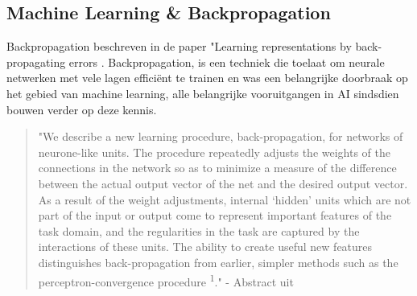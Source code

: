\subsection{Machine Learning \& Backpropagation}
\label{ssec:machinelearaningandbackpropagation}
Backpropagation beschreven in de paper "Learning representations by back-propagating errors \autocite{Rumelhart1986}.
Backpropagation, is een techniek die toelaat om neurale netwerken met vele lagen efficiënt te trainen en was een belangrijke doorbraak op het gebied van machine learning, alle belangrijke vooruitgangen in AI sindsdien bouwen verder op deze kennis.

\begin{quote}
    "We describe a new learning procedure, back-propagation, for networks of neurone-like units. The procedure repeatedly adjusts the weights of the connections in the network so as to minimize a measure of the difference between the actual output vector of the net and the desired output vector. As a result of the weight adjustments, internal ‘hidden’ units which are not part of the input or output come to represent important features of the task domain, and the regularities in the task are captured by the interactions of these units. The ability to create useful new features distinguishes back-propagation from earlier, simpler methods such as the perceptron-convergence procedure \textsuperscript{1}."
    - Abstract uit \autocite{Rumelhart1986}
\end{quote}

